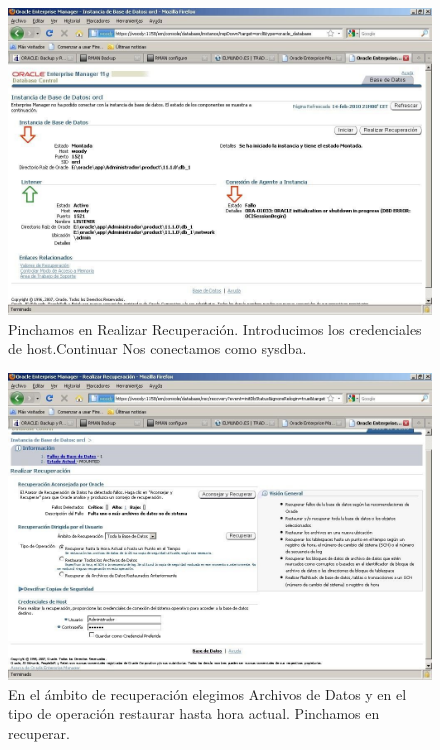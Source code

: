 \begin{figure}[h]
\includegraphics[width=1\textwidth]{../images/backupEM-9.jpg}
\caption{Pinchamos en Realizar Recuperación. Introducimos los credenciales de host.Continuar Nos conectamos como sysdba.}
\label{fig:backup9}
\end{figure}

\begin{figure}[h]
\includegraphics[width=1\textwidth]{../images/backupEM-10.jpg}
\caption{En el ámbito de recuperación elegimos Archivos de Datos y en el tipo de operación restaurar hasta hora actual. Pinchamos en recuperar.}
\label{fig:backup10}
\end{figure}
